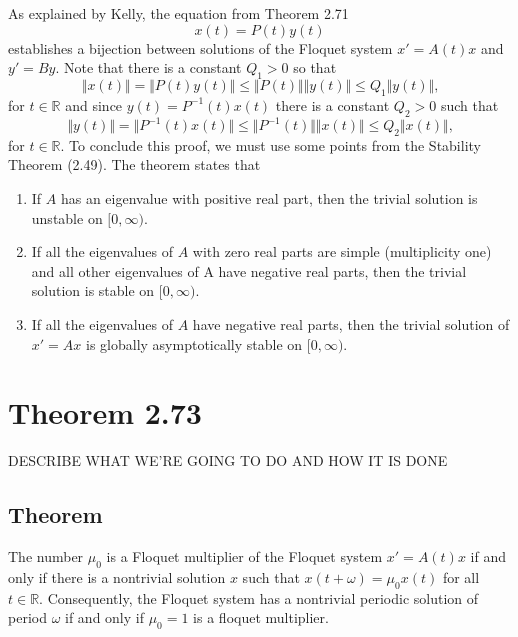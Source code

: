 \documentclass[a4paper]{article}
\begin{document}
As explained by Kelly, the equation from Theorem 2.71 
\begin{equation*}
    x(t) = P(t)y(t)
\end{equation*}
establishes a bijection between solutions of the Floquet system $x' = A(t)x$ and $y' = By$. Note that there is a constant $Q_1 > 0$ so that 
\begin{equation*}
    \Vert x(t) \Vert = \Vert P(t)y(t) \Vert \leq \Vert P(t) \Vert \Vert y(t) \Vert  \leq Q_{1} \Vert y(t) \Vert \text{,}
\end{equation*}
for $t \in \mathbb{R}$ and since $y(t) = P^{-1}(t)x(t)$ there is a constant $Q_2 > 0$ such that 
\begin{equation*}
    \Vert y(t) \Vert = \Vert P^{-1}(t)x(t) \Vert \leq \Vert P^{-1}(t) \Vert \Vert x(t) \Vert  \leq Q_{2} \Vert x(t) \Vert \text{,}
\end{equation*}
for $t \in \mathbb{R}$. To conclude this proof, we must use some points from the Stability Theorem (2.49). The theorem states that \begin{enumerate}
    \item If $A$ has an eigenvalue with positive real part, then the trivial solution is unstable on $[0,\infty)$.
    \item If all the eigenvalues of $A$ with zero real parts are simple (multiplicity one) and all other eigenvalues of A have negative real parts, then the trivial solution is stable on $[0,\infty)$.
    \item If all the eigenvalues of $A$ have negative real parts, then the trivial solution of $x' = Ax$ is globally asymptotically stable on $[0,\infty)$.
\end{enumerate}

\section{Theorem 2.73}

DESCRIBE WHAT WE'RE GOING TO DO AND HOW IT IS DONE

\subsection{Theorem}

The number $\mu_0$ is a Floquet multiplier of the Floquet system $x' = A(t)x$ if and only if there is a nontrivial solution $x$ such that $x(t + \omega) = \mu_0 x(t)$ for all $t \in \mathbb{R}$. Consequently, the Floquet system has a nontrivial periodic solution of period $\omega$ if and only if $\mu_0 = 1$ is a floquet multiplier.
\end{document}
